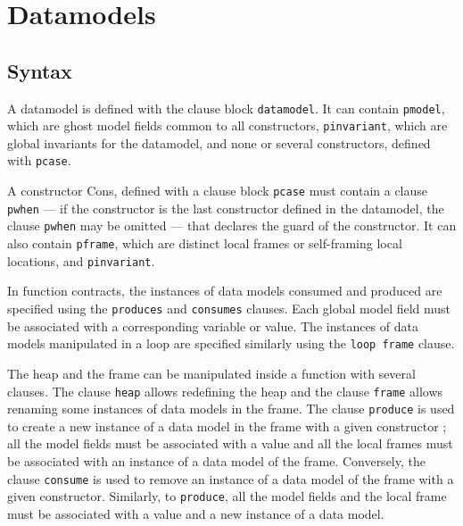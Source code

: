 \chapter{Datamodels}
\label{toc:datamodels}

\section{Syntax}
\label{toc:syntax}

A datamodel is defined with the clause block \texttt{datamodel}. It can
contain \texttt{pmodel}, which are ghost model fields common to all
constructors, \texttt{pinvariant}, which are global invariants for the
datamodel, and none or several constructors, defined with \texttt{pcase}.

A constructor Cons, defined with a clause block \texttt{pcase} must contain
a clause \texttt{pwhen} --- if the constructor is the last constructor defined
in the datamodel, the clause \texttt{pwhen} may be omitted --- that declares the
guard of the constructor. It can also
contain \texttt{pframe}, which are distinct local frames or self-framing local
locations, and \texttt{pinvariant}.

In function contracts, the instances of data models consumed and produced
are specified using the \texttt{produces} and \texttt{consumes} clauses.
Each global model field must be associated with a corresponding variable
or value. The instances of data models manipulated in a loop are specified
similarly using the \texttt{loop frame} clause.

The heap and the frame can be manipulated inside a function with several
clauses. The clause \texttt{heap} allows redefining the heap and the clause
\texttt{frame} allows renaming some instances of data models in the frame.
The clause \texttt{produce} is used to create a new instance of a data model in
the frame with a given constructor ; all the model fields must be associated
with a value and all the local frames must be associated with an instance of
a data model of the frame.
Conversely, the clause \texttt{consume} is used to remove an instance of a
data model of the frame with a given constructor. Similarly, to
\texttt{produce}, all the model fields and the local frame must be associated
with a value and a new instance of a data model.

